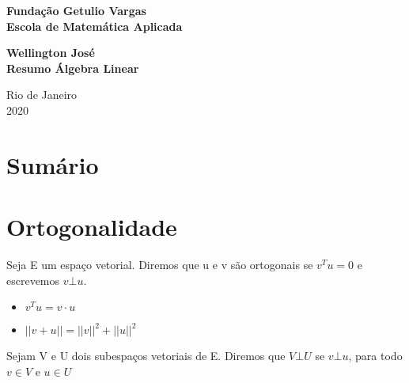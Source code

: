 \documentclass[12pt]{article}
\begin{document}
\begin{titlepage}
\begin{center}
\textbf{\LARGE Fundação Getulio Vargas}\\ 
\textbf{\LARGE Escola de Matemática Aplicada}

\par
\vspace{170pt}
\textbf{\Large Wellington José}\\
\vspace{32pt}
\textbf{\Large Resumo Álgebra Linear}\\
\end{center}

\par
\vfill
\begin{center}
{{\normalsize Rio de Janeiro}\\
{\normalsize 2020}}
\end{center}
\end{titlepage}

\thispagestyle{empty}

\section*{Sumário}

\hspace{6mm}\textbf{}
\vspace{4mm}

\textbf{}
\vspace{4mm}

\textbf{}
\vspace{4mm}

\textbf{}
\vspace{4mm}

\textbf{}

\newpage

\section*{Ortogonalidade}
\label{s1}
    Seja E um espaço vetorial. Diremos que u e v são ortogonais se $v^Tu = 0$ e escrevemos $v \bot u$.
    \begin{itemize}
        \item $v^T u = v \cdot u$
        \item $||v + u|| = ||v||^2 + ||u||^2$
    \end{itemize}
    Sejam V e U dois subespaços vetoriais de E. Diremos que $V \bot U$ se $v \bot u$, para todo $v \in V$ e $u \in U$
    
\end{document}
